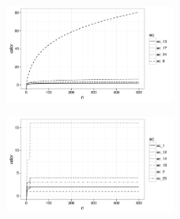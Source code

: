 \documentclass{article}
\begin{document}
\begin{figure}[H]
\centering
\includegraphics[width=0.5\textwidth]{img/graf_06.png}
\end{figure}

\begin{figure}[H]
\centering
\includegraphics[width=0.5\textwidth]{img/graf_07.png}
\end{figure}
\end{document}
